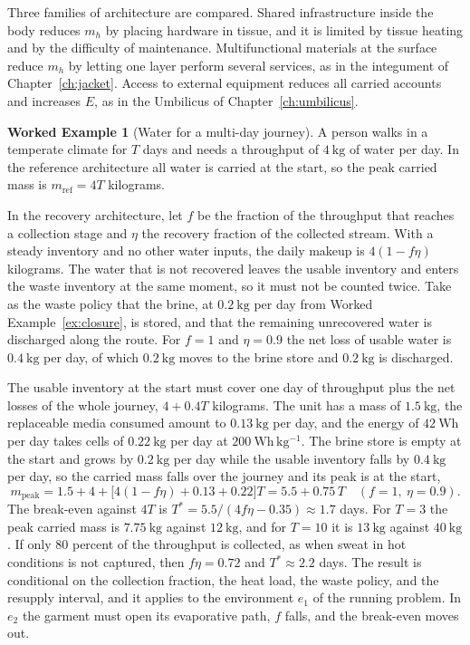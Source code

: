 \documentclass[11pt,openany]{book}
\theoremstyle{definition}
\newtheorem{example}{Worked Example}[chapter]
\theoremstyle{remark}
\begin{document}
Three families of architecture are compared. Shared infrastructure inside the body reduces $m_h$ by placing hardware in tissue, and it is limited by tissue heating and by the difficulty of maintenance. Multifunctional materials at the surface reduce $m_h$ by letting one layer perform several services, as in the integument of Chapter~\ref{ch:jacket}. Access to external equipment reduces all carried accounts and increases $E$, as in the Umbilicus of Chapter~\ref{ch:umbilicus}.

\begin{example}[Water for a multi-day journey]
\label{ex:journey}
A person walks in a temperate climate for $T$ days and needs a throughput of $4\ \mathrm{kg}$ of water per day. In the reference architecture all water is carried at the start, so the peak carried mass is $m_{\mathrm{ref}}=4T$ kilograms.

In the recovery architecture, let $f$ be the fraction of the throughput that reaches a collection stage and $\eta$ the recovery fraction of the collected stream. With a steady inventory and no other water inputs, the daily makeup is $4(1-f\eta)$ kilograms. The water that is not recovered leaves the usable inventory and enters the waste inventory at the same moment, so it must not be counted twice. Take as the waste policy that the brine, at $0.2\ \mathrm{kg}$ per day from Worked Example~\ref{ex:closure}, is stored, and that the remaining unrecovered water is discharged along the route. For $f=1$ and $\eta=0.9$ the net loss of usable water is $0.4\ \mathrm{kg}$ per day, of which $0.2\ \mathrm{kg}$ moves to the brine store and $0.2\ \mathrm{kg}$ is discharged.

The usable inventory at the start must cover one day of throughput plus the net losses of the whole journey, $4+0.4T$ kilograms. The unit has a mass of $1.5\ \mathrm{kg}$, the replaceable media consumed amount to $0.13\ \mathrm{kg}$ per day, and the energy of $42\ \mathrm{Wh}$ per day takes cells of $0.22\ \mathrm{kg}$ per day at $200\ \mathrm{Wh\,kg^{-1}}$. The brine store is empty at the start and grows by $0.2\ \mathrm{kg}$ per day while the usable inventory falls by $0.4\ \mathrm{kg}$ per day, so the carried mass falls over the journey and its peak is at the start,
\[
m_{\mathrm{peak}}=1.5+4+\big[4(1-f\eta)+0.13+0.22\big]T=5.5+0.75\,T\quad(f=1,\ \eta=0.9).
\]
The break-even against $4T$ is $T^{*}=5.5/(4f\eta-0.35)\approx1.7$ days. For $T=3$ the peak carried mass is $7.75\ \mathrm{kg}$ against $12\ \mathrm{kg}$, and for $T=10$ it is $13\ \mathrm{kg}$ against $40\ \mathrm{kg}$. If only $80$ percent of the throughput is collected, as when sweat in hot conditions is not captured, then $f\eta=0.72$ and $T^{*}\approx2.2$ days. The result is conditional on the collection fraction, the heat load, the waste policy, and the resupply interval, and it applies to the environment $e_1$ of the running problem. In $e_2$ the garment must open its evaporative path, $f$ falls, and the break-even moves out.
\end{example}
\end{document}
